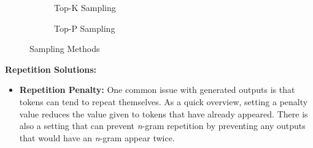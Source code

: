 \documentclass[12pt]{report}
\begin{document}
\begin{itemize}
\begin{itemize}
            \begin{figure}[H]
            \centering
            \begin{subfigure}[b]{0.75\textwidth}
               \caption{Top-K Sampling}
            \end{subfigure}
            
            \begin{subfigure}[b]{0.75\textwidth}
               \caption{Top-P Sampling}
            \end{subfigure}
            \caption{Sampling Methods ~\cite{HF}}
            \end{figure}
            
            \end{itemize}
        \end{itemize}
        
        \textbf{Repetition Solutions:}
        
        \begin{itemize}
            \item \textbf{Repetition Penalty:} One common issue with generated outputs is that tokens can tend to repeat themselves. As a quick overview, setting a penalty value reduces the value given to tokens that have already appeared. There is also a setting that can prevent \textit{n}-gram repetition by preventing any outputs that would have an \textit{n}-gram appear twice.
        \end{itemize}
        
\end{document}
